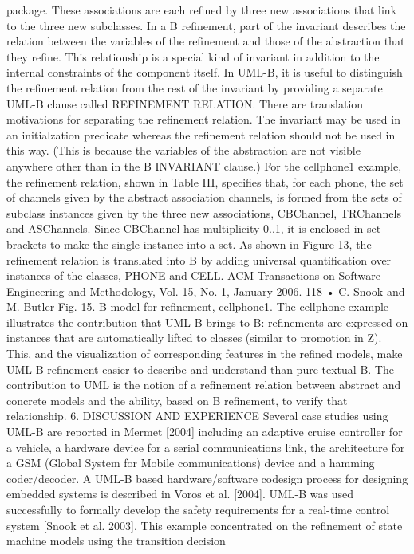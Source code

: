 package. These associations are each refined by three new associations that
link to the three new subclasses.
In a B refinement, part of the invariant describes the relation between the
variables of the refinement and those of the abstraction that they refine. This
relationship is a special kind of invariant in addition to the internal constraints
of the component itself. In UML-B, it is useful to distinguish the refinement
relation from the rest of the invariant by providing a separate UML-B clause
called REFINEMENT RELATION. There are translation motivations for separating
the refinement relation. The invariant may be used in an initialzation predicate
whereas the refinement relation should not be used in this way. (This is because
the variables of the abstraction are not visible anywhere other than in the B
INVARIANT clause.) For the cellphone1 example, the refinement relation, shown
in Table III, specifies that, for each phone, the set of channels given by the
abstract association channels, is formed from the sets of subclass instances
given by the three new associations, CBChannel, TRChannels and ASChannels.
Since CBChannel has multiplicity 0..1, it is enclosed in set brackets to make the
single instance into a set.
As shown in Figure 13, the refinement relation is translated into B by adding
universal quantification over instances of the classes, PHONE and CELL.
ACM Transactions on Software Engineering and Methodology, Vol. 15, No. 1, January 2006.
118 • C. Snook and M. Butler
Fig. 15. B model for refinement, cellphone1.
The cellphone example illustrates the contribution that UML-B brings to B:
refinements are expressed on instances that are automatically lifted to classes
(similar to promotion in Z). This, and the visualization of corresponding features in the refined models, make UML-B refinement easier to describe and
understand than pure textual B. The contribution to UML is the notion of a refinement relation between abstract and concrete models and the ability, based
on B refinement, to verify that relationship.
6. DISCUSSION AND EXPERIENCE
Several case studies using UML-B are reported in Mermet [2004] including an
adaptive cruise controller for a vehicle, a hardware device for a serial communications link, the architecture for a GSM (Global System for Mobile communications) device and a hamming coder/decoder. A UML-B based hardware/software
codesign process for designing embedded systems is described in Voros et al.
[2004]. UML-B was used successfully to formally develop the safety requirements for a real-time control system [Snook et al. 2003]. This example concentrated on the refinement of state machine models using the transition decision
